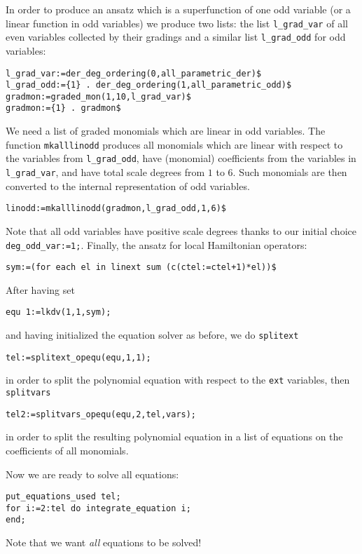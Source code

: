In order to produce an ansatz which is a superfunction of one odd variable (or
a linear function in odd variables) we produce two lists: the list
\texttt{l\_grad\_var} of all even variables collected by their gradings and a
similar list \texttt{l\_grad\_odd} for odd variables:
\begin{verbatim}
l_grad_var:=der_deg_ordering(0,all_parametric_der)$
l_grad_odd:={1} . der_deg_ordering(1,all_parametric_odd)$
gradmon:=graded_mon(1,10,l_grad_var)$
gradmon:={1} . gradmon$
\end{verbatim}
We need a list of graded monomials which are linear in odd variables. The
function \texttt{mkalllinodd} produces all monomials which are linear with
respect to the variables from \texttt{l\_grad\_odd}, have (monomial)
coefficients from the variables in \texttt{l\_grad\_var}, and have total scale
degrees from $1$ to $6$. Such monomials are then converted to the internal
representation of odd variables.
\begin{verbatim}
linodd:=mkalllinodd(gradmon,l_grad_odd,1,6)$
\end{verbatim}
Note that all odd variables have positive scale degrees thanks to our initial
choice \texttt{deg\_odd\_var:={1};}.
Finally, the ansatz for local Hamiltonian operators:
\begin{verbatim}
sym:=(for each el in linext sum (c(ctel:=ctel+1)*el))$
\end{verbatim}
After having set
\begin{verbatim}
equ 1:=lkdv(1,1,sym);
\end{verbatim}
and having initialized the equation solver as before, we do \texttt{splitext}
\begin{verbatim}
tel:=splitext_opequ(equ,1,1);
\end{verbatim}
in order to split the polynomial equation with respect to the \texttt{ext}
variables, then \texttt{splitvars}
\begin{verbatim}
tel2:=splitvars_opequ(equ,2,tel,vars);
\end{verbatim}
in order to split the resulting polynomial equation in a list of equations on
the coefficients of all monomials.

Now we are ready to solve all equations:
\begin{verbatim}
put_equations_used tel;
for i:=2:tel do integrate_equation i;
end;
\end{verbatim}
Note that we want \emph{all} equations to be solved!

